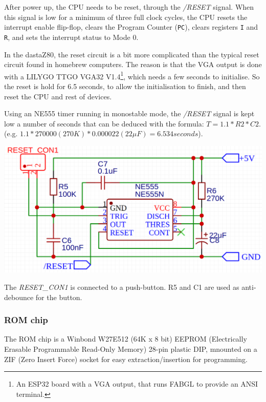 \documentclass[a4paper,11pt]{article}
\begin{document}
    After power up, the CPU needs to be reset, through the \textit{/RESET}
    signal. When this signal is low for a minimum of three full clock cycles,
    the CPU resets the interrupt enable flip-flop, clears the Program Counter
    (\texttt{PC}), clears registers \texttt{I} and \texttt{R}, and sets the
    interrupt status to Mode 0. 

    In the dastaZ80, the reset circuit is a bit more complicated than the 
    typical reset circuit found in homebrew computers. The reason is that the
    VGA output is done with a LILYGO TTGO  VGA32 V1.4\footnote{An ESP32 board
    with a VGA output, that runs FABGL to provide an ANSI terminal.}, which
    needs a few seconds to initialise. So the reset is hold for 6.5 seconds, to
    allow the initialisation to finish,  and then reset the CPU and rest of
    devices.

    Using an NE555 timer running in monostable mode, the \textit{/RESET} signal
    is kept low a number of seconds that can be deduced with the formula: 
    $T = 1.1 * R2 * C2$. (e.g. $1.1 * 270000 (270K) * 0.000022 (22\mu F) = 
    6.534 seconds$).

    \begin{center}
        \includegraphics[scale=0.3]{dastaz80resetcircuit.png}
    \end{center}

    The \textit{RESET\_CON1} is connected to a push-button. R5 and C1 are used as 
    anti-debounce for the button.

    \subsubsection{ROM chip}

    The ROM chip is a Winbond W27E512 (64K x 8 bit) EEPROM (Electrically Erasable
    Programmable Read-Only Memory) 28-pin plastic DIP, mnounted on a ZIF (Zero
    Insert Force) socket for easy extraction/insertion for programming.
\end{document}
